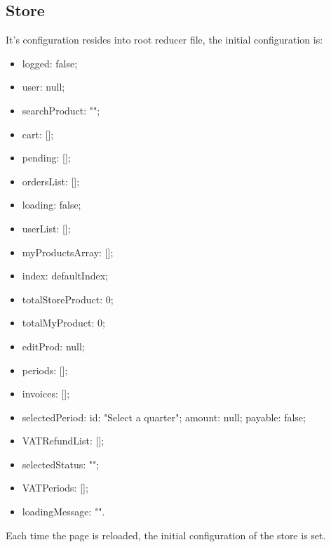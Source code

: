 \subsection{Store}
It's configuration resides into root reducer file, the initial configuration is:
\begin{itemize}
	\item logged: false;
	
	\item user: null;
	
	\item searchProduct: "";
	
	\item cart: [];
	
	\item pending: [];
	
	\item ordersList: [];
	
	\item loading: false;
	
	\item userList: [];
	
	\item myProductsArray: [];
	
	\item index: defaultIndex;
	
	\item totalStoreProduct: 0;
	
	\item totalMyProduct: 0;
	
	\item editProd: null;
	
	\item periods: [];
	
	\item invoices: [];
	
	\item selectedPeriod: {id: "Select a quarter"; amount: null; payable: false};
	
	\item VATRefundList: [];
	
	\item selectedStatus: "";
	
	\item VATPeriods: [];
	
	\item loadingMessage: "".
\end{itemize}
Each time the page is reloaded, the initial configuration of the store is set.


